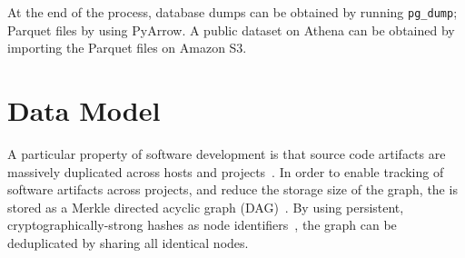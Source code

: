 At the end of the process, database dumps can be obtained by running
\texttt{pg\_dump}; Parquet files by using PyArrow. A public dataset on
Athena can be obtained by importing the Parquet files on Amazon S3.


\section{Data Model}
\label{sec:data-model}

A particular property of software development is that source code artifacts are
massively duplicated across hosts and
projects~\cite{ipres-2017-software-heritage}. In order to enable tracking of
software artifacts across projects, and reduce the storage size of the graph,
the \SWHGD is stored as a Merkle directed acyclic graph (DAG)~\cite{Merkle}. By
using persistent, cryptographically-strong hashes as node
identifiers~\cite{ipres-2018-doi}, the graph can be deduplicated by sharing all
identical nodes.


